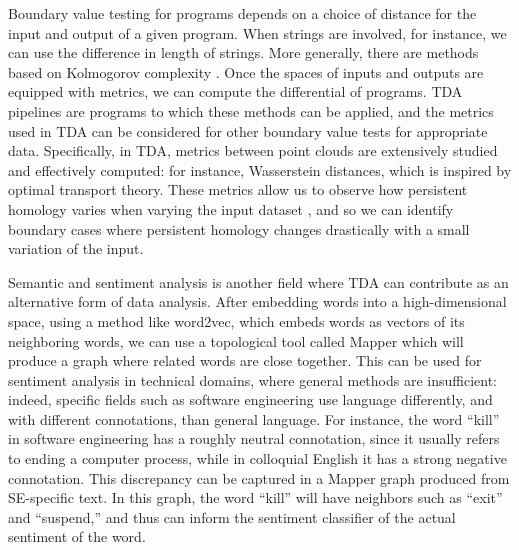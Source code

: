 \documentclass[11pt, oneside]{article}
\begin{document}
Boundary value testing for programs depends on a choice of distance for the input and output of a given program. When strings are involved, for instance, we can use the difference in length of strings. More generally, there are methods based on Kolmogorov complexity \cite{DdOF2020}. Once the spaces of inputs and outputs are equipped with metrics, we can compute the differential of programs. TDA pipelines are programs to which these methods can be applied, and the metrics used in TDA can be considered for other boundary value tests for appropriate data. Specifically, in TDA, metrics between point clouds are extensively studied and effectively computed: for instance, Wasserstein distances, which is inspired by optimal transport theory. These metrics allow us to observe how persistent homology varies when varying the input dataset \cite{CCILRU2020}, and so we can identify boundary cases where persistent homology changes drastically with a small variation of the input.

Semantic and sentiment analysis is another field where TDA can contribute as an alternative form of data analysis. After embedding words into a high-dimensional space, using a method like word2vec, which embeds words as vectors of its neighboring words, we can use a topological tool called Mapper \cite{SMC2007} which will produce a graph where related words are close together. This can be used for sentiment analysis in technical domains, where general methods are insufficient: indeed, specific fields such as software engineering use language differently, and with different connotations, than general language. For instance, the word “kill” in software engineering has a roughly neutral connotation, since it usually refers to ending a computer process, while in colloquial English it has a strong negative connotation. This discrepancy can be captured in a Mapper graph produced from SE-specific text. In this graph, the word “kill” will have neighbors such as “exit” and “suspend,” and thus can inform the sentiment classifier of the actual sentiment of the word.\\
\end{document}

